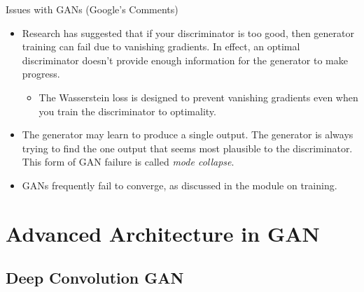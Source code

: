 \documentclass[aspectratio=169,xcolor=dvipsnames,svgnames,x11names,fleqn]{beamer}
\begin{document}

\begin{frame}{Issues with GANs (Google's Comments)}
\begin{tblock}{}
\begin{itemize}
    \item Research has suggested that if your discriminator is too good, then generator training can fail due to vanishing gradients. In effect, an optimal discriminator doesn't provide enough information for the generator to make progress.
    \begin{itemize}
        \item The Wasserstein loss is designed to prevent vanishing gradients even when you train the discriminator to optimality. 
    \end{itemize}
    \item The generator may learn to produce a single output. The generator is always trying to find the one output that seems most plausible to the discriminator. This form of GAN failure is called {\em mode collapse}.
    \item GANs frequently fail to converge, as discussed in the module on training.
\end{itemize}
\end{tblock}
\end{frame}


\section{Advanced Architecture in GAN}

\begin{frame}
    \sectionpage
\end{frame}


\subsection{Deep Convolution GAN}

\begin{frame}
    \subsectionpage
\end{frame}
\end{document}

